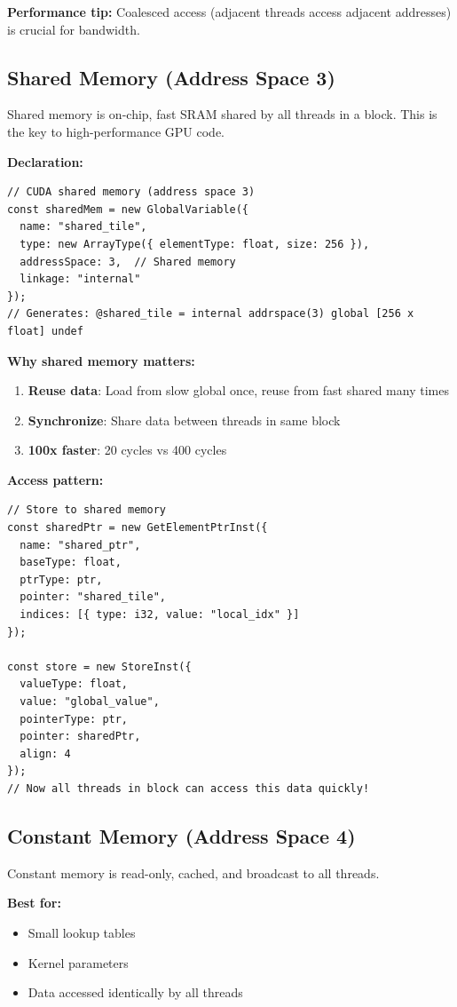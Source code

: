 \documentclass[11pt]{article}
\begin{document}
\textbf{Performance tip:} Coalesced access (adjacent threads access adjacent addresses) is crucial for bandwidth.

\subsection{Shared Memory (Address Space 3)}

Shared memory is on-chip, fast SRAM shared by all threads in a block. This is the key to high-performance GPU code.

\textbf{Declaration:}
\begin{lstlisting}[style=ts]
// CUDA shared memory (address space 3)
const sharedMem = new GlobalVariable({
  name: "shared_tile",
  type: new ArrayType({ elementType: float, size: 256 }),
  addressSpace: 3,  // Shared memory
  linkage: "internal"
});
// Generates: @shared_tile = internal addrspace(3) global [256 x float] undef
\end{lstlisting}

\textbf{Why shared memory matters:}
\begin{enumerate}[noitemsep]
  \item \textbf{Reuse data}: Load from slow global once, reuse from fast shared many times
  \item \textbf{Synchronize}: Share data between threads in same block
  \item \textbf{100x faster}: 20 cycles vs 400 cycles
\end{enumerate}

\textbf{Access pattern:}
\begin{lstlisting}[style=ts]
// Store to shared memory
const sharedPtr = new GetElementPtrInst({
  name: "shared_ptr",
  baseType: float,
  ptrType: ptr,
  pointer: "shared_tile",
  indices: [{ type: i32, value: "local_idx" }]
});

const store = new StoreInst({
  valueType: float,
  value: "global_value",
  pointerType: ptr,
  pointer: sharedPtr,
  align: 4
});
// Now all threads in block can access this data quickly!
\end{lstlisting}

\subsection{Constant Memory (Address Space 4)}

Constant memory is read-only, cached, and broadcast to all threads.

\textbf{Best for:}
\begin{itemize}[noitemsep]
  \item Small lookup tables
  \item Kernel parameters
  \item Data accessed identically by all threads
\end{itemize}
\end{document}
